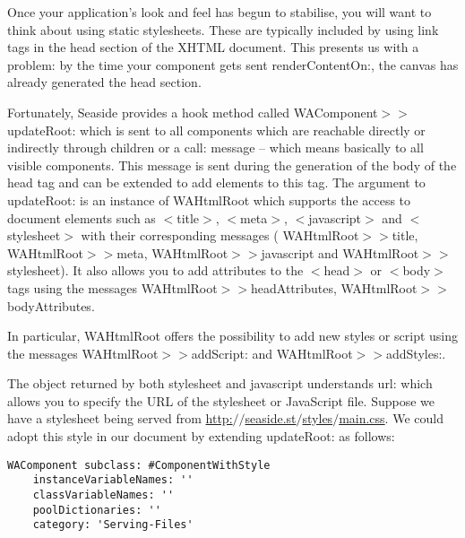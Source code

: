 \documentclass[a4paper,10pt,twoside]{book}
\newcommand{\ct}[1]{{\small\ttfamily\textup{#1}}}
\begin{document}
Once your application's look and feel has begun to stabilise, you will want to think about using static stylesheets. These are typically included by using \ct{link} tags in the \ct{head} section of the XHTML document. This presents us with a problem: by the time your component gets sent \ct{renderContentOn:}, the canvas has already generated the \ct{head} section.

Fortunately, Seaside provides a hook method called  \ct{WAComponent$>$$>$updateRoot:} which is sent to all components which are reachable directly or indirectly through children or a \ct{call:} message -- which means basically to all visible components. This message is sent during the generation of the body of the \ct{head} tag and can be extended to add elements to this tag. The argument to \ct{updateRoot:} is an instance of  \ct{WAHtmlRoot} which supports the access to document elements such as \ct{$<$title$>$}, \ct{$<$meta$>$}, \ct{$<$javascript$>$} and \ct{$<$stylesheet$>$} with their corresponding messages ( \ct{WAHtmlRoot$>$$>$title},  \ct{WAHtmlRoot$>$$>$meta},  \ct{WAHtmlRoot$>$$>$javascript} and  \ct{WAHtmlRoot$>$$>$stylesheet}). It also allows you to add attributes to the \ct{$<$head$>$} or \ct{$<$body$>$} tags  using the messages  \ct{WAHtmlRoot$>$$>$headAttributes},  \ct{WAHtmlRoot$>$$>$bodyAttributes}. 

In particular,  \ct{WAHtmlRoot} offers the possibility to add new styles or script using the messages  \ct{WAHtmlRoot$>$$>$addScript:} and  \ct{WAHtmlRoot$>$$>$addStyles:}.

The object returned by both  \ct{stylesheet} and  \ct{javascript} understands \ct{url:} which allows you to specify the URL of the stylesheet or JavaScript file. Suppose we have a stylesheet being served from \href{http://seaside.st/styles/main.css}{http:$/$$/$seaside.st$/$styles$/$main.css}. We could adopt this style in our document by extending \ct{updateRoot:} as follows:

\begin{lstlisting}
WAComponent subclass: #ComponentWithStyle
    instanceVariableNames: ''
    classVariableNames: ''
    poolDictionaries: ''
    category: 'Serving-Files'
\end{lstlisting}
\end{document}

